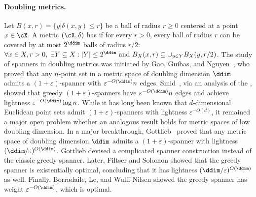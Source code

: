 \paragraph{Doubling metrics.} Let $B(x,r) = \{y | \delta(x,y)\leq r\}$ be a ball of radius $r\geq 0$ centered at a point $x\in \cX$. A metric $(\cX,\delta)$ has  if for every $r > 0$, every ball of radius $r$ can be covered by at most $2^{\ddim}$ balls of radius $r/2$: $\forall x\in X, r > 0,~\exists Y\subseteq X: |Y|\leq 2^{\ddim} \text{ and } B_X(x,r) \subseteq \cup_{y\in Y} B_X(y,r/2)$. 
The study of spanners in doubling metrics was initiated by Gao, Guibas, and Nguyen~\cite{gao2004deformable}, who proved that any $n$-point set in a metric space of doubling dimension $\ddim$ admits a $(1+\varepsilon)$-spanner with $\varepsilon^{-O(\ddim)} n$ edges.
Smid~\cite{smid2009weak}, via an analysis of the , showed that greedy $(1+\varepsilon)$-spanners have $\varepsilon^{-O(\ddim)} n$ edges and achieve lightness $\varepsilon^{-O(\ddim)} \log n$. While it has long been known that $d$-dimensional Euclidean point sets admit $(1+\varepsilon)$-spanners with lightness $\varepsilon^{-O(d)}$, it remained a major open problem whether an analogous result holds for metric spaces of low doubling dimension. 
In a major breakthrough, Gottlieb~\cite{gottlieb2015light} proved that any metric space of doubling dimension $\ddim$ admits a $(1+\varepsilon)$-spanner with lightness $(\ddim/\varepsilon)^{O(\ddim)}$. 
Gottlieb devised a complicated spanner construction instead of the classic greedy spanner.
Later, Filtser and Solomon \cite{FS20} showed that the greedy spanner is existentially optimal, concluding that it has lightness $(\ddim/\varepsilon)^{O(\ddim)}$ as well.
Finally, Borradaile, Le, and Wulff-Nilsen \cite{BLW19} showed the greedy spanner has
weight $\varepsilon^{-O(\ddim)}$, which is optimal.
%
